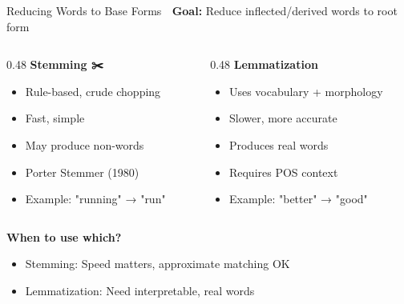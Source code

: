 \documentclass[aspectratio=169]{beamer}
\begin{document}
\begin{frame}[shrink=10]{Reducing Words to Base Forms 🌱}
    \textbf{Goal:} Reduce inflected/derived words to root form

    \begin{columns}[T]
        \begin{column}{0.48\textwidth}
            \textbf{Stemming ✂️}
            \begin{itemize}\setlength{\itemsep}{0pt}
                \item Rule-based, crude chopping
                \item Fast, simple
                \item May produce non-words
                \item Porter Stemmer (1980)
                \item Example: "running" → "run"
            \end{itemize}
        \end{column}
        \begin{column}{0.48\textwidth}
            \textbf{Lemmatization 🧠}
            \begin{itemize}\setlength{\itemsep}{0pt}
                \item Uses vocabulary + morphology
                \item Slower, more accurate
                \item Produces real words
                \item Requires POS context
                \item Example: "better" → "good"
            \end{itemize}
        \end{column}
    \end{columns}

    \vspace{1em}
    \textbf{When to use which?}
    \begin{itemize}\setlength{\itemsep}{0pt}
        \item Stemming: Speed matters, approximate matching OK
        \item Lemmatization: Need interpretable, real words
    \end{itemize}
\end{frame}
\end{document}
